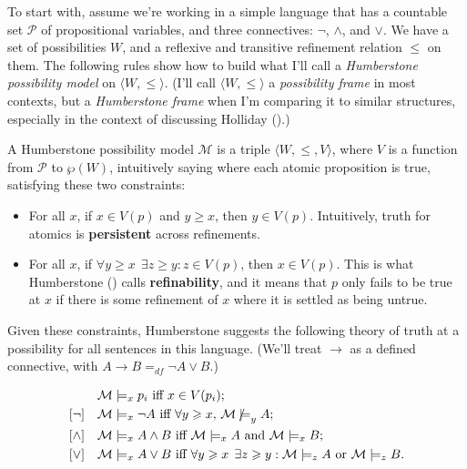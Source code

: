 \documentclass[
  11pt,
  letterpaper,
  DIV=11,
  numbers=noendperiod,
  twoside]{scrartcl}
\providecommand{\tightlist}{%
  \setlength{\itemsep}{0pt}\setlength{\parskip}{0pt}}
\newcommand{\nmodels}{\mathrel{\ooalign{$\models$\cr\raisebox{-0.001ex}{\hss$\mkern-1mu/\hss$}\cr}}}
\begin{document}
To start with, assume we're working in a simple language that has a
countable set \(\mathcal{P}\) of propositional variables, and three
connectives: \(\neg\), \(\wedge\), and \(\vee\). We have a set of
possibilities \(W\), and a reflexive and transitive refinement relation
\(\leqslant\) on them. The following rules show how to build what I'll
call a \emph{Humberstone possibility model} on
\(\langle W, \leqslant \rangle\). (I'll call
\(\langle W, \leqslant \rangle\) a \emph{possibility frame} in most
contexts, but a \emph{Humberstone frame} when I'm comparing it to
similar structures, especially in the context of discussing Holliday
().)

A Humberstone possibility model \(\mathcal{M}\) is a triple
\(\langle W, \leqslant, V \rangle\), where \(V\) is a function from
\(\mathcal{P}\) to \(\wp(W)\), intuitively saying where each atomic
proposition is true, satisfying these two constraints:

\begin{itemize}
\tightlist
\item
  For all \(x\), if \(x \in V(p)\) and \(y \geqslant x\), then
  \(y \in V(p)\). Intuitively, truth for atomics is \textbf{persistent}
  across refinements.
\item
  For all \(x\), if
  \(\forall y \geqslant x\;\, \exists z \geqslant y: z \in V(p)\), then
  \(x \in V(p)\). This is what Humberstone
  () calls
  \textbf{refinability}, and it means that \(p\) only fails to be true
  at \(x\) if there is some refinement of \(x\) where it is settled as
  being untrue.
\end{itemize}

Given these constraints, Humberstone suggests the following theory of
truth at a possibility for all sentences in this language. (We'll treat
\(\rightarrow\) as a defined connective, with
\(A \rightarrow B =_{df} \neg A \vee B\).)

\begin{align*}
[\text{Vbls}] \quad & \mathcal{M} \models_x p_i \text{ iff } x \in V(p_i); \\
[\neg] \quad & \mathcal{M} \models_x \neg A \text{ iff } \forall y \geqslant x, \, \mathcal{M} \nmodels_y  A; \\
[\wedge] \quad & \mathcal{M} \models_x A \wedge B \text{ iff } \mathcal{M} \models_x A \text{ and } \mathcal{M} \models_x B; \\
[\vee] \quad & \mathcal{M} \models_x A \vee B \text{ iff } \forall y \geqslant x \;\, \exists z \geqslant y : \mathcal{M} \models_z A \text{ or } \mathcal{M} \models_z B.
\end{align*}
\end{document}

